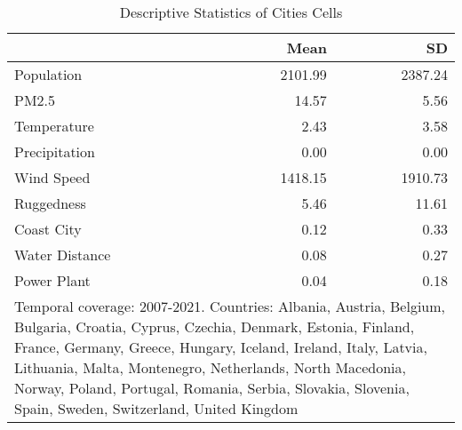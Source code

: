 \begin{table}

\caption{Descriptive Statistics of Cities Cells}
\centering
\begin{tabular}[t]{lrr}
\toprule
  & Mean & SD\\
\midrule
Population & \num{2101.99} & \num{2387.24}\\
PM2.5 & \num{14.57} & \num{5.56}\\
Temperature & \num{2.43} & \num{3.58}\\
Precipitation & \num{0.00} & \num{0.00}\\
Wind Speed & \num{1418.15} & \num{1910.73}\\
Ruggedness & \num{5.46} & \num{11.61}\\
Coast City & \num{0.12} & \num{0.33}\\
Water Distance & \num{0.08} & \num{0.27}\\
Power Plant & \num{0.04} & \num{0.18}\\
\bottomrule
\multicolumn{3}{l}{\rule{0pt}{1em}Temporal coverage: 2007-2021. Countries: Albania, Austria, Belgium, Bulgaria, Croatia, Cyprus, Czechia, Denmark, Estonia, Finland, France, Germany, Greece, Hungary, Iceland, Ireland, Italy, Latvia, Lithuania, Malta, Montenegro, Netherlands, North Macedonia, Norway, Poland, Portugal, Romania, Serbia, Slovakia, Slovenia, Spain, Sweden, Switzerland, United Kingdom}\\
\end{tabular}
\end{table}
